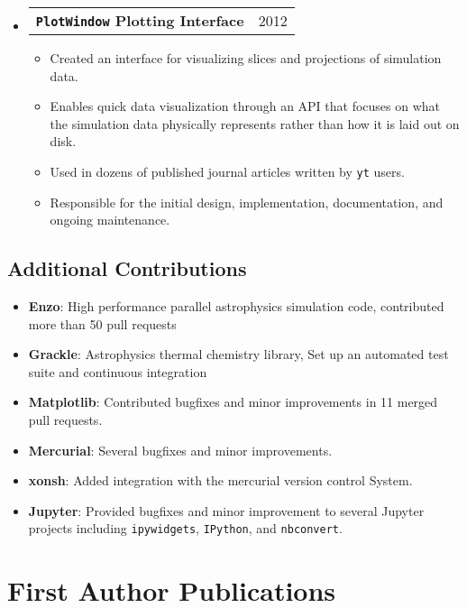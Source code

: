 \documentclass[10pt,letterpaper]{article}
\newcommand{\textline}[2]{
  \begin{tabularx}{\textwidth}{XY}
  #1 & #2
  \end{tabularx}
}
\begin{document}
\begin{itemize}
\item[] \textline{\bf \texttt{PlotWindow} Plotting Interface}{2012}
  \begin{itemize}
    \item Created an interface for visualizing slices and projections of
      simulation data.
    \item Enables quick data visualization through an API that focuses on what
      the simulation data physically represents rather than how it is laid out
      on disk.
    \item Used in dozens of published journal articles written by
      \texttt{yt} users.
    \item Responsible for the initial design, implementation, documentation, and
      ongoing maintenance.
  \end{itemize}

\end{itemize}

\subsection*{Additional Contributions}

\begin{itemize}
\item[] {\bf Enzo}: High performance parallel astrophysics simulation code,
  contributed more than 50 pull requests
\item[] {\bf Grackle}: Astrophysics thermal chemistry library, Set up an
  automated test suite and continuous integration
\item[] {\bf Matplotlib}: Contributed bugfixes and minor improvements in 11
  merged pull requests.
\item[] {\bf Mercurial}: Several bugfixes and minor improvements.
\item[] {\bf xonsh}: Added integration with the mercurial version control System.
\item[] {\bf Jupyter}: Provided bugfixes and minor improvement to several
  Jupyter projects including \texttt{ipywidgets}, \texttt{IPython}, and
  \texttt{nbconvert}.
\end{itemize}

\section*{First Author Publications}
\end{document}
